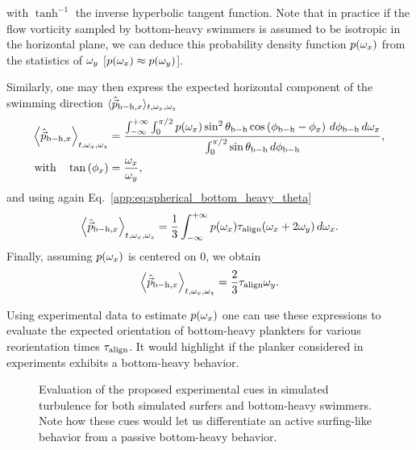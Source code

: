 with $\tanh^{-1}$ the inverse hyperbolic tangent function.
Note that in practice if the flow vorticity sampled by bottom-heavy swimmers is assumed to be isotropic in the horizontal plane, we can deduce this probability density function $p(\omega_x)$ from the statistics of $\omega_{y}$ [$p(\omega_x) \approx p(\omega_y)$].

Similarly, one may then express the expected horizontal component of the swimming direction $\langle \hat{\vec{p}}_{\mathrm{b-h}, x} \rangle_{t, \omega_x, \omega_z}$
\begin{subequations}
	\begin{align}
		\left\langle \hat{\vec{p}}_{\mathrm{b-h}, x} \right\rangle_{t, \omega_x, \omega_z} &= \frac{\int_{-\infty}^{+\infty} \int_0^{\pi/2} p(\omega_x) \sin^2 \theta_{\mathrm{b-h}} \cos \left( \phi_{\mathrm{b-h}} - \phi_x \right) \, d \phi_{\mathrm{b-h}} \, d\omega_x}{\int_0^{\pi/2} \sin \theta_{\mathrm{b-h}} \, d \phi_{\mathrm{b-h}}},\\
		\text{with} \quad \tan \left( \phi_x \right) &= \frac{\omega_x}{\omega_y},
	\end{align}
\end{subequations}
and using again Eq.~\eqref{app:eq:spherical_bottom_heavy_theta}
\begin{equation}
	\left\langle \hat{\vec{p}}_{\mathrm{b-h}, x} \right\rangle_{t, \omega_x, \omega_z} = \frac{1}{3} \int_{-\infty}^{+\infty} p(\omega_x) \tau_{\mathrm{align}} ( \omega_x + 2 \omega_y) \, d\omega_x.
\end{equation}
Finally, assuming $p(\omega_x)$ is centered on $0$, we obtain
\begin{equation}
	\left\langle \hat{\vec{p}}_{\mathrm{b-h}, x} \right\rangle_{t, \omega_x, \omega_z} = \frac{2}{3} \tau_{\mathrm{align}} \omega_y.
\end{equation}

Using experimental data to estimate $p(\omega_x)$ one can use these expressions to evaluate the expected orientation of bottom-heavy plankters for various reorientation times $\tau_{\mathrm{align}}$.
It would highlight if the planker considered in experiments exhibits a bottom-heavy behavior.
\begin{figure}
	\centering
	
	\caption[Evaluation of the proposed experimental cues in simulated turbulence.]{
		Evaluation of the proposed experimental cues in simulated turbulence for both simulated surfers and bottom-heavy swimmers.
		Note how these cues would let us differentiate an active surfing-like behavior from a passive bottom-heavy behavior.
	}
	\label{fig:experimental_cues}
\end{figure}

